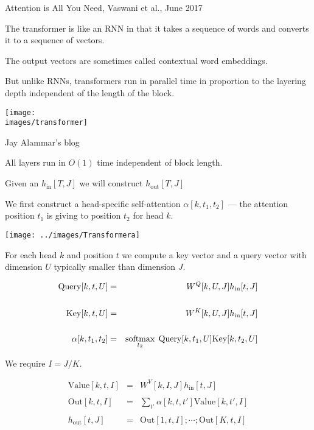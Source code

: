 {

Attention is All You Need, Vaswani et al., June 2017

\vfill
The transformer is like an RNN in that it takes a sequence of words and converts it to a sequence of vectors.

\vfill
The output vectors are sometimes called contextual word embeddings.

\vfill
But unlike RNNs, transformers run in parallel time in proportion to the layering depth
independent of the length of the block.


\centerline{\texttt{[image: \\images/transformer]}}

{\huge
\centerline{Jay Alammar's blog}
}

All layers run in $O(1)$ time independent of block length.


Given an $h_\mathrm{in}[T,J]$ we will construct $h_\mathrm{out}[T,J]$
\vfill

We first construct a head-specific self-attention $\alpha[k,t_1,t_2]$ --- the attention position
$t_1$ is giving to position $t_2$ for head $k$.

\vfill
\centerline{\texttt{[image: ../images/Transformera]}}


For each head $k$ and position $t$ we compute a key vector and a query vector with dimension $U$ typically smaller than dimension $J$.
      
\begin{eqnarray*}
\mathrm{Query}[k,t,U] & = & W^Q[k,U,J]h_\mathrm{in}[t,J] \\
\\
\mathrm{Key}[k,t,U] & = &  W^K[k,U,J]h_\mathrm{in}[t,J] \\
\\
\alpha[k,t_1,t_2] & = & \operatorname*{softmax}_{t_2}\; \mathrm{Query}[k,t_1,U]\mathrm{Key}[k,t_2,U]
\end{eqnarray*}


We require $I = J/K$.
      
\begin{eqnarray*}
\mathrm{Value}[k,t,I] & = & W^V[k,I,J]h_\mathrm{in}[t,J] \\
\\
\mathrm{Out}[k,t,I] & = & \sum_{t'}\alpha[k,t,t']\mathrm{Value}[k,t',I] \\
\\
h_\mathrm{out}[t,J] & = & \mathrm{Out}[1,t,I];\cdots;\mathrm{Out}[K,t,I]
\end{eqnarray*}

}
